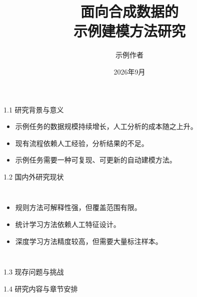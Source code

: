 \documentclass[aspectratio=169,11pt]{ctexbeamer}
\title{面向合成数据的\\示例建模方法研究}
\author{示例作者}
\date{2026年9月}
\begin{document}
\begin{frame}[plain]
\DefenseCoverFrame
\end{frame}

\begin{frame}[plain]
\end{frame}

\begin{frame}{1.1 研究背景与意义}
\begin{itemize}
  \item 示例任务的数据规模持续增长，人工分析的成本随之上升。
  \item 现有流程依赖人工经验，分析结果的不足。
  \item 示例任务需要一种可复现、可更新的自动建模方法。
\end{itemize}
\end{frame}

\begin{frame}{1.2 国内外研究现状}
\begin{columns}[T,onlytextwidth]
  \begin{itemize}
    \item 规则方法可解释性强，但覆盖范围有限。
    \item 统计学习方法依赖人工特征设计。
    \item 深度学习方法精度较高，但需要大量标注样本。
  \end{itemize}
\end{columns}
\end{frame}

\begin{frame}{1.3 现存问题与挑战}
\end{frame}

\begin{frame}{1.4 研究内容与章节安排}
\end{frame}
\end{document}
